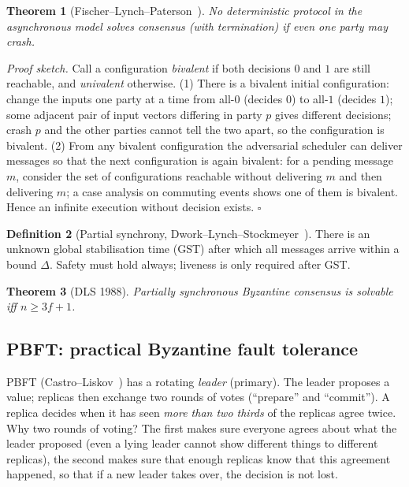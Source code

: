 \documentclass[11pt,a4paper]{article}
\newenvironment{plainenglish}{\par\smallskip}{\par\smallskip}
\newenvironment{formal}{\par\smallskip}{\par\smallskip}
\theoremstyle{definition}
\newtheorem{definition}{Definition}[section]
\theoremstyle{plain}
\newtheorem{theorem}[definition]{Theorem}
\theoremstyle{remark}
\begin{document}
\begin{formal}
\begin{theorem}[Fischer--Lynch--Paterson~\cite{FLP85}]
No deterministic protocol in the asynchronous model solves consensus (with termination) if even one party may crash.
\end{theorem}
\emph{Proof sketch.} Call a configuration \emph{bivalent} if both decisions $0$ and $1$ are still reachable, and \emph{univalent} otherwise. (1) There is a bivalent initial configuration: change the inputs one party at a time from all-$0$ (decides $0$) to all-$1$ (decides $1$);
some adjacent pair of input vectors differing in party $p$ gives different decisions; crash $p$ and the other parties cannot tell the two apart, so the configuration is bivalent. (2) From any bivalent configuration the adversarial scheduler can deliver messages so that the next configuration is again bivalent:
for a pending message $m$, consider the set of configurations reachable without delivering $m$ and then delivering $m$; a case analysis on commuting events shows one of them is bivalent. Hence an infinite execution without decision exists. $\square$

\begin{definition}[Partial synchrony, Dwork--Lynch--Stockmeyer~\cite{DLS88}]
There is an unknown global stabilisation time (GST) after which all messages arrive within a bound $\Delta$. Safety must hold always; liveness is only required after GST.
\end{definition}
\begin{theorem}[DLS 1988]
Partially synchronous Byzantine consensus is solvable iff $n\ge3f+1$.
\end{theorem}
\end{formal}

\subsection{PBFT: practical Byzantine fault tolerance}

\begin{plainenglish}
PBFT (Castro--Liskov~\cite{CL99}) has a rotating \emph{leader} (primary). The leader proposes a value; replicas then exchange two rounds of votes (``prepare'' and ``commit''). A replica decides when it has seen \emph{more than two thirds}
of the replicas agree twice. Why two rounds of voting? The first makes sure everyone agrees about what the leader proposed (even a lying leader cannot show different things to different replicas), the second makes sure that enough replicas know that this agreement happened, so that if a new leader takes over,
the decision is not lost.
\end{plainenglish}
\end{document}

